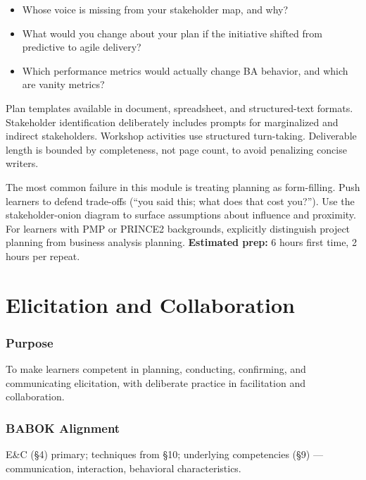 \documentclass[11pt,letterpaper,oneside]{report}
\begin{document}
\begin{curriculumreflection}
\begin{itemize}
  \item Whose voice is missing from your stakeholder map, and why?
  \item What would you change about your plan if the initiative shifted from predictive to agile delivery?
  \item Which performance metrics would actually change BA behavior, and which are vanity metrics?
\end{itemize}
\end{curriculumreflection}

\begin{curriculumnote}
Plan templates available in document, spreadsheet, and structured-text formats. Stakeholder identification deliberately includes prompts for marginalized and indirect stakeholders. Workshop activities use structured turn-taking. Deliverable length is bounded by completeness, not page count, to avoid penalizing concise writers.
\end{curriculumnote}

\begin{curriculumteachingnotes}
The most common failure in this module is treating planning as form-filling. Push learners to defend trade-offs (``you said this; what does that cost you?''). Use the stakeholder-onion diagram to surface assumptions about influence and proximity. For learners with PMP or PRINCE2 backgrounds, explicitly distinguish project planning from business analysis planning. \textbf{Estimated prep:} 6 hours first time, 2 hours per repeat.
\end{curriculumteachingnotes}

\chapter{Elicitation and Collaboration}

\subsection*{Purpose}
To make learners competent in planning, conducting, confirming, and communicating elicitation, with deliberate practice in facilitation and collaboration.

\subsection*{BABOK Alignment}
E\&C (\S4) primary; techniques from \S10; underlying competencies (\S9) --- communication, interaction, behavioral characteristics.
\end{document}
